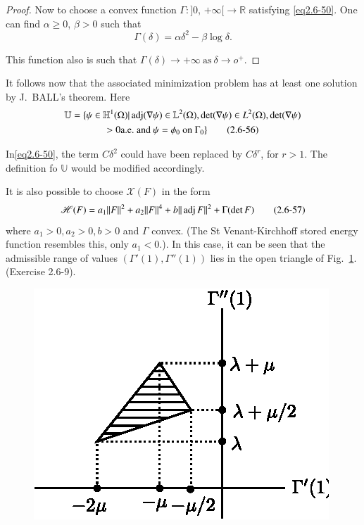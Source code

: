 \begin{proof}
 Now to choose a convex function $\Gamma : ]0$, $+ \infty [ \to
    \mathbb{R}$ satisfying \eqref{eq2.6-50}. One can find $\alpha \geq 0$,
    $\beta >0$ such that 
  \begin{equation*}
\Gamma (\delta) = \alpha \delta^2 - \beta \log \delta. \tag
    {2.6-55}\label{Eq2.6-55} 
 \end{equation*} 
 
 This function also is such that $\Gamma (\delta) \to + \infty
 ~\text{as}~ \delta \to o^+$.  
 \end{proof}

It follows now that the associated minimization problem has at least
one solution by J.~BALL's theorem. Here 
\begin{multline*}
\mathbb{U}=\{\psi \in \mathbb{H}^1 (\Omega)| \operatorname{adj} (\nabla \psi)
\in \mathbb{L}^2 (\Omega), \det (\nabla \psi) \in L^2 (\Omega),
\det (\nabla \psi)\\
> 0 \text{a.e.}~ \text{and}~ \psi =\phi_0 ~\text{on}~
\Gamma _0 \} \tag{2.6-56}\label{eq2.6-56} 
\end{multline*}
 
\begin{remark}\label{chap2-rem2.6.8} %
In\pageoriginale \eqref{eq2.6-50}, the term $C \delta ^2$ could have been
replaced by $C \delta^ r$, for $r > 1$. The definition fo $\mathbb{U}$
would be modified accordingly.  
\end{remark}

\begin{remark}\label{chap2-rem2.6.9} %
It is also possible to choose $\mathcal{X}(F)$ in the form
\begin{equation*}
\mathscr{H}(F)= a_1 \| F \| ^2 +a_2 \| F \|^4 +b \| \operatorname{adj} F \| ^2 +
\Gamma (\det F) \tag{2.6-57}\label{eq2.6-57} 
\end{equation*} 
where $a_1>0, a_2>0, b> 0$ and $\Gamma$ convex. (The St
Venant-Kirchhoff stored energy function resembles this, only
$a_1<0. $). In this case, it can be seen that the admissible range of
values $(\Gamma '(1), \Gamma ''(1))$ lies in the open triangle of
Fig.~\ref{fig2.6.2}. (Exercise 2.6-9).  
\begin{figure}[H]
\centering
\includegraphics{vol71-figures/fig2.6-2.eps}
\caption{}\label{fig2.6.2}
\end{figure}
\end{remark}

